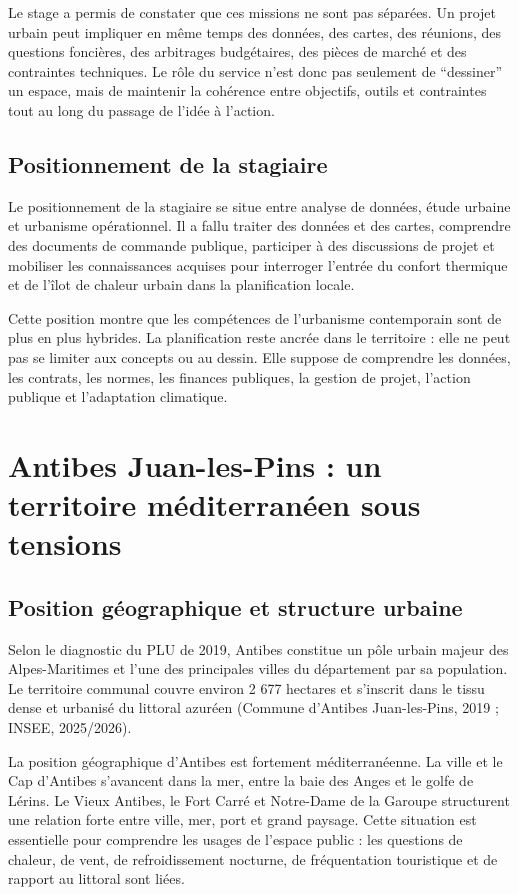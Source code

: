 \documentclass[11pt,a4paper]{report}
\begin{document}
Le stage a permis de constater que ces missions ne sont pas séparées. Un projet urbain peut impliquer en même temps des données, des cartes, des réunions, des questions foncières, des arbitrages budgétaires, des pièces de marché et des contraintes techniques. Le rôle du service n'est donc pas seulement de \enquote{dessiner} un espace, mais de maintenir la cohérence entre objectifs, outils et contraintes tout au long du passage de l'idée à l'action.

\subsection{Positionnement de la stagiaire}

Le positionnement de la stagiaire se situe entre analyse de données, étude urbaine et urbanisme opérationnel. Il a fallu traiter des données et des cartes, comprendre des documents de commande publique, participer à des discussions de projet et mobiliser les connaissances acquises pour interroger l'entrée du confort thermique et de l'îlot de chaleur urbain dans la planification locale.

Cette position montre que les compétences de l'urbanisme contemporain sont de plus en plus hybrides. La planification reste ancrée dans le territoire : elle ne peut pas se limiter aux concepts ou au dessin. Elle suppose de comprendre les données, les contrats, les normes, les finances publiques, la gestion de projet, l'action publique et l'adaptation climatique.

\section{Antibes Juan-les-Pins : un territoire méditerranéen sous tensions}

\subsection{Position géographique et structure urbaine}

Selon le diagnostic du PLU de 2019, Antibes constitue un pôle urbain majeur des Alpes-Maritimes et l'une des principales villes du département par sa population. Le territoire communal couvre environ 2 677 hectares et s'inscrit dans le tissu dense et urbanisé du littoral azuréen (Commune d'Antibes Juan-les-Pins, 2019 ; INSEE, 2025/2026).

La position géographique d'Antibes est fortement méditerranéenne. La ville et le Cap d'Antibes s'avancent dans la mer, entre la baie des Anges et le golfe de Lérins. Le Vieux Antibes, le Fort Carré et Notre-Dame de la Garoupe structurent une relation forte entre ville, mer, port et grand paysage. Cette situation est essentielle pour comprendre les usages de l'espace public : les questions de chaleur, de vent, de refroidissement nocturne, de fréquentation touristique et de rapport au littoral sont liées.
\end{document}
